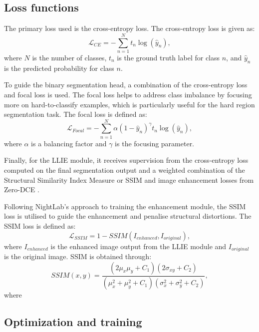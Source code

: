 \documentclass[journal]{IEEEtran}
\begin{document}
\subsection{Loss functions}
The primary loss used is the cross-entropy loss. The cross-entropy loss is given as:
\begin{equation}
    \mathcal{L}_{CE} = - \sum_{n=1}^{N} t_n \log(\hat{y}_n),
\end{equation}
where \(N\) is the number of classes, \(t_n\) is the ground truth label for class \(n\), and \(\hat{y}_n\) is the predicted probability for class \(n\).

To guide the binary segmentation head, a combination of the cross-entropy loss and focal loss is used. The focal loss helps to address class imbalance by focusing more on hard-to-classify examples, which is particularly useful for the hard region segmentation task.
The focal loss is defined as:
\begin{equation}
    \mathcal{L}_{Focal} = - \sum_{n=1}^{N} \alpha (1 - \hat{y}_n)^\gamma t_n \log(\hat{y}_n),
\end{equation}
where \(\alpha\) is a balancing factor and \(\gamma\) is the focusing parameter.

Finally, for the LLIE module, it receives supervision from the cross-entropy loss computed on the final segmentation output and a weighted combination of the Structural Similarity Index Measure or SSIM \cite {wangImageQualityAssessment2004} and image enhancement losses from Zero-DCE \cite{guoZeroReferenceDeepCurve2020,liLearningEnhanceLowLight2021}.

Following NightLab's \cite{dengNightLabDualLevelArchitecture2022} approach to training the enhancement module, the SSIM loss is utilised to guide the enhancement and penalise structural distortions. The SSIM loss is defined as:
\begin{equation}
    \mathcal{L}_{SSIM} = 1 - SSIM(I_{enhanced}, I_{original}),
\end{equation}
where \(I_{enhanced}\) is the enhanced image output from the LLIE module and \(I_{original}\) is the original image. SSIM is obtained through:
\begin{equation}
    SSIM(x, y) = \frac{(2\mu_x \mu_y + C_1)(2\sigma_{xy} + C_2)}{(\mu_x^2 + \mu_y^2 + C_1)(\sigma_x^2 + \sigma_y^2 + C_2)},
\end{equation}
where

\subsection{Optimization and training}
\end{document}
